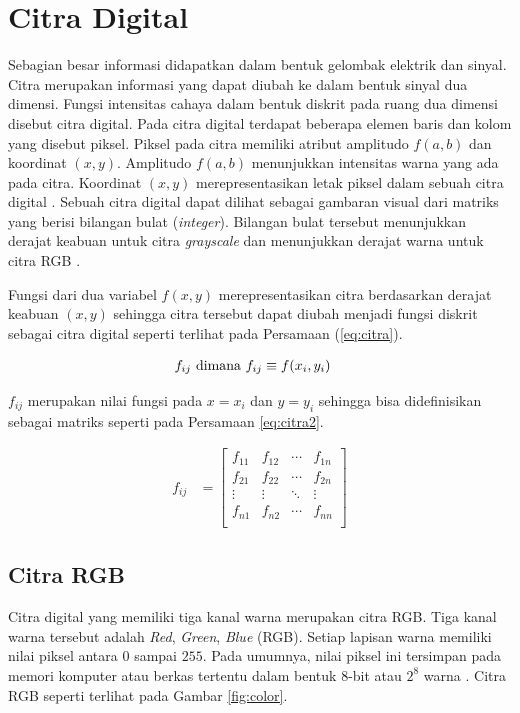 \section{Citra Digital}
Sebagian besar informasi didapatkan dalam bentuk gelombak elektrik dan sinyal. Citra merupakan informasi yang dapat diubah ke dalam bentuk sinyal dua dimensi. Fungsi intensitas cahaya dalam bentuk diskrit pada ruang dua dimensi disebut citra digital. Pada citra digital terdapat beberapa elemen baris dan kolom yang disebut piksel. Piksel pada citra memiliki atribut amplitudo $f(a,b)$ dan koordinat $(x,y)$. Amplitudo $f(a,b)$ menunjukkan intensitas warna yang ada pada citra. Koordinat $(x,y)$ merepresentasikan letak piksel dalam sebuah citra digital \citep{Ratna2020}. Sebuah citra digital dapat dilihat sebagai gambaran visual dari matriks yang berisi bilangan bulat (\textit{integer}). Bilangan bulat tersebut menunjukkan derajat keabuan untuk citra \textit{grayscale} dan menunjukkan derajat warna untuk citra RGB \citep{Blackledge2005,Septiaji2018}.

Fungsi dari dua variabel $f(x,y)$ merepresentasikan citra berdasarkan derajat keabuan $(x,y)$ sehingga citra tersebut dapat diubah menjadi fungsi diskrit sebagai citra digital seperti terlihat pada Persamaan (\ref{eq:citra}).

\begin{align}
    f_{ij} \textnormal{ dimana } f_{ij} &\equiv f(x_i, y_i)
    \label{eq:citra}
\end{align}

$f_{ij}$ merupakan nilai fungsi pada $x=x_i$ dan $y=y_i$ sehingga bisa didefinisikan sebagai matriks seperti pada Persamaan \ref{eq:citra2}.

\begin{align}
    f_{ij} &=
    \begin{bmatrix}
        f_{11} &f_{12} &\cdots &f_{1n}\\
        f_{21} &f_{22} &\cdots &f_{2n}\\
        \vdots &\vdots &\ddots &\vdots\\
        f_{n1} &f_{n2} &\cdots &f_{nn}\\
    \end{bmatrix}
    \label{eq:citra2}
\end{align}

    \subsection{Citra RGB}
    Citra digital yang memiliki tiga kanal warna merupakan citra RGB. Tiga kanal warna tersebut adalah \textit{Red}, \textit{Green}, \textit{Blue} (RGB). Setiap lapisan warna memiliki nilai piksel antara $0$ sampai $255$. Pada umumnya, nilai piksel ini tersimpan pada memori komputer atau berkas tertentu dalam bentuk 8-bit atau $2^8$ warna \citep{Septiaji2018}. Citra RGB seperti terlihat pada Gambar \ref{fig:color}.

